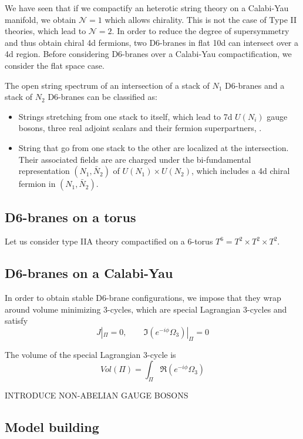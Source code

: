 We have seen that if we compactify an heterotic string theory on a Calabi-Yau manifold, we obtain
$\mathcal N=1$ which allows chirality. 
This is not the case of Type II theories, which lead to $\mathcal N=2$.
In order to reduce the degree of supersymmetry and thus obtain chiral 4d fermions, two D6-branes in flat 10d can intersect over a 4d region.
Before considering D6-branes over a Calabi-Yau compactification, we consider the flat space
case.

The open string spectrum of an intersection of a stack of $N_1$ D6-branes and a stack of $N_2$ D6-branes
can be classified as:

\begin{itemize}
  \item Strings stretching from one stack to itself, which lead to 7d $U(N_i)$ gauge bosons, three real
    adjoint scalars and their fermion superpartners, .
  \item String that go from one stack to the other are localized at the intersection. 
    Their associated fields are are charged under the bi-fundamental representation $(N_1, \bar N_2)$ of 
    $U(N_1)\times U(N_2)$, which includes a 4d chiral fermion in $(N_1,\bar N_2)$.
\end{itemize}

\subsection{D6-branes on a torus}

Let us consider type IIA theory compactified on a 6-torus $T^6=T^2 \times T^2 \times T^2$.

\subsection{D6-branes on a Calabi-Yau}
In order to obtain stable D6-brane configurations, we impose that they wrap around volume 
minimizing 3-cycles, which are special Lagrangian 3-cycles and satisfy
\begin{equation}
  J|_\Pi = 0 , \qquad \Im (e^{-i\phi}\Omega_3)|_\Pi=0
\end{equation}

The volume of the special Lagrangian 3-cycle is
\begin{equation}
  Vol(\Pi)=\int_\Pi \Re(e^{-i\phi}\Omega_3)
\end{equation}




INTRODUCE NON-ABELIAN GAUGE BOSONS

\subsection{Model building}
